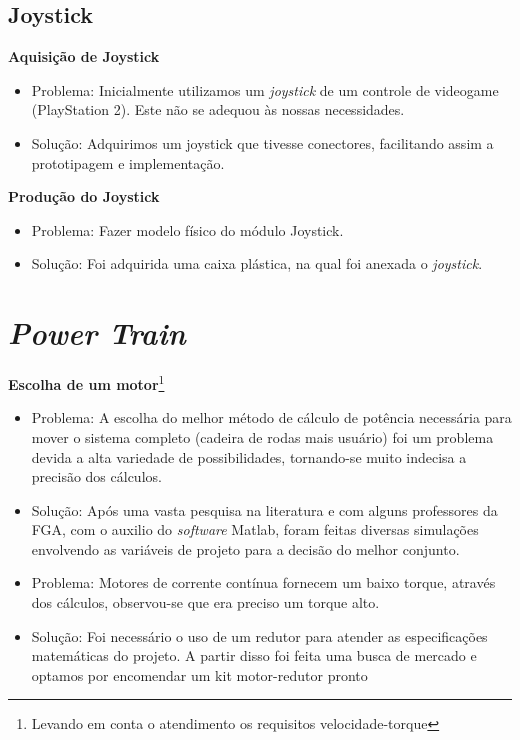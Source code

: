 \subsection{Joystick}

\textbf{Aquisição de Joystick}

 \begin{itemize}
  \item Problema: Inicialmente utilizamos um \textit{joystick} de um controle de videogame (PlayStation 2). Este não se adequou às nossas necessidades.
  \item Solução: Adquirimos um joystick que tivesse conectores, facilitando assim a prototipagem e implementação.
\end{itemize}

\textbf{Produção do Joystick}

\begin{itemize}
  \item Problema: Fazer modelo físico do módulo Joystick.
  \item Solução: Foi adquirida uma caixa plástica, na qual foi anexada o \textit{joystick}.
 \end{itemize}

\section{\textit{Power Train}}

\textbf{Escolha de um motor}\footnote{Levando em conta o atendimento os requisitos velocidade-torque}

 \begin{itemize}
  \item Problema: A escolha do melhor método de cálculo de potência necessária para mover o sistema completo (cadeira de rodas mais usuário) foi um problema devida a alta variedade de possibilidades, tornando-se muito indecisa a precisão dos cálculos.
  \item Solução: Após uma vasta pesquisa na literatura e com alguns professores da FGA, com o auxilio do \textit{software} Matlab, foram feitas diversas simulações envolvendo as variáveis de projeto para a decisão do melhor conjunto.

  \item Problema: Motores de corrente contínua fornecem um baixo torque, através dos cálculos, observou-se que era preciso um torque alto.
  \item Solução: Foi necessário o uso de um redutor para atender as especificações matemáticas do projeto. A partir disso foi feita uma busca de mercado e optamos por encomendar um kit motor-redutor pronto

 \end{itemize}


